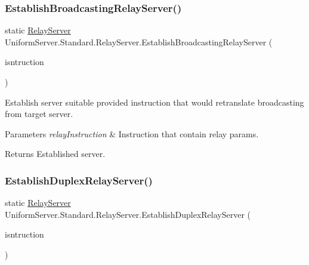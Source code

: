 \subsubsection{\texorpdfstring{Establish\+Broadcasting\+Relay\+Server()}{EstablishBroadcastingRelayServer()}}
{\footnotesize\ttfamily static \mbox{\hyperlink{class_uniform_server_1_1_standard_1_1_relay_server}{Relay\+Server}} Uniform\+Server.\+Standard.\+Relay\+Server.\+Establish\+Broadcasting\+Relay\+Server (\begin{DoxyParamCaption}\item[{\mbox{\hyperlink{class_pipes_provider_1_1_networking_1_1_routing_1_1_relay_instruction}{Relay\+Instruction}}}]{isntruction }\end{DoxyParamCaption})\hspace{0.3cm}{\ttfamily [static]}}



Establish server suitable provided instruction that would retranslate broadcasting from target server. 


\begin{DoxyParams}{Parameters}
{\em relay\+Instruction} & Instruction that contain relay params.\\
\hline
\end{DoxyParams}
\begin{DoxyReturn}{Returns}
Established server.
\end{DoxyReturn}
\mbox{\label{class_uniform_server_1_1_standard_1_1_relay_server_a6a3e3701a479f5ee4846d79c4a153f7e}} 
\subsubsection{\texorpdfstring{Establish\+Duplex\+Relay\+Server()}{EstablishDuplexRelayServer()}}
{\footnotesize\ttfamily static \mbox{\hyperlink{class_uniform_server_1_1_standard_1_1_relay_server}{Relay\+Server}} Uniform\+Server.\+Standard.\+Relay\+Server.\+Establish\+Duplex\+Relay\+Server (\begin{DoxyParamCaption}\item[{\mbox{\hyperlink{class_pipes_provider_1_1_networking_1_1_routing_1_1_relay_instruction}{Relay\+Instruction}}}]{isntruction }\end{DoxyParamCaption})\hspace{0.3cm}{\ttfamily [static]}}



